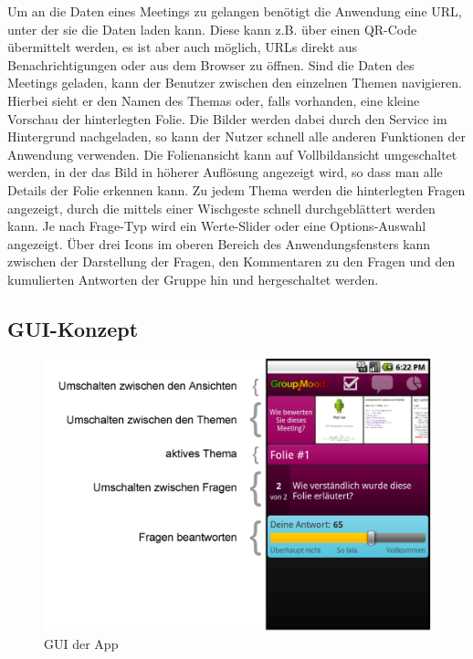 Um an die Daten eines Meetings zu gelangen benötigt die Anwendung eine URL, unter der sie die Daten laden kann. Diese kann z.B. über einen QR-Code übermittelt werden, es ist aber auch möglich, URLs direkt aus Benachrichtigungen oder aus dem Browser zu öffnen. Sind die Daten des Meetings geladen, kann der Benutzer zwischen den einzelnen Themen navigieren. Hierbei sieht er den Namen des Themas oder, falls vorhanden, eine kleine Vorschau der hinterlegten Folie. Die Bilder werden dabei durch den Service im Hintergrund nachgeladen, so kann der Nutzer schnell alle anderen Funktionen der Anwendung verwenden. Die Folienansicht kann auf Vollbildansicht umgeschaltet werden, in der das Bild in höherer Auflösung angezeigt wird, so dass man alle Details der Folie erkennen kann. Zu jedem Thema werden die hinterlegten Fragen angezeigt, durch die mittels einer Wischgeste schnell durchgeblättert werden kann. Je nach Frage-Typ wird ein Werte-Slider oder eine Options-Auswahl angezeigt. Über drei Icons im oberen Bereich des Anwendungsfensters kann zwischen der Darstellung der Fragen, den Kommentaren zu den Fragen und den kumulierten Antworten der Gruppe hin und hergeschaltet werden.

\subsection{GUI-Konzept}

\begin{figure}[htb]
\begin{center}
\includegraphics[width=\textwidth]{media/app.png}
\end{center}
\caption{GUI der App}
\label{f:gui}
\end{figure}

